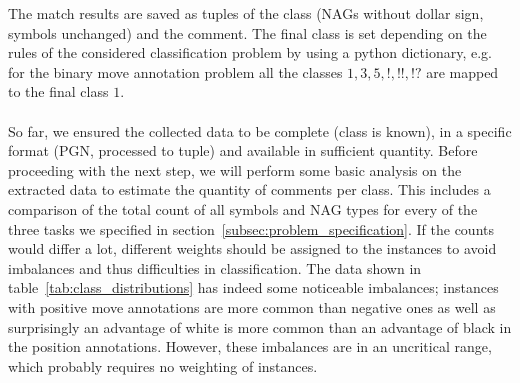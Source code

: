\documentclass[article,type=msc,colorback,accentcolor=tud7b]{tudthesis}
\begin{document}
    The match results are saved as tuples of the class (NAGs without dollar sign, symbols unchanged) and the comment. The final class is set depending on the rules of the considered classification problem by using a python dictionary, e.g. for the binary move annotation problem all the classes $1, 3, 5, !, !!, !?$ are mapped to the final class $1$. \\\\
    So far, we ensured the collected data to be complete (class is known), in a specific format (PGN, processed to tuple) and available in sufficient quantity. Before proceeding with the next step, we will perform some basic analysis on the extracted data to estimate the quantity of comments per class. This includes a comparison of the total count of all symbols and NAG types for every of the three tasks we specified in section~\ref{subsec:problem_specification}. If the counts would differ a lot, different weights should be assigned to the instances to avoid imbalances and thus difficulties in classification. The data shown in table~\ref{tab:class_distributions} has indeed some noticeable imbalances; instances with positive move annotations are more common than negative ones as well as surprisingly an advantage of white is more common than an advantage of black in the position annotations. However, these imbalances are in an uncritical range, which probably requires no weighting of instances.
\end{document}
